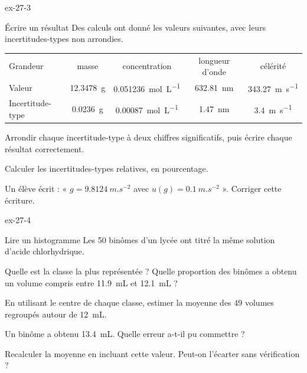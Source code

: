 \begin{blocLivre}{ex-27-3}
\begin{exercice}[1]{Écrire un résultat}
Des calculs ont donné les valeurs suivantes, avec leurs incertitudes-types non arrondies.
\begin{center}
\begin{tabular}{lcccc}
\toprule
Grandeur & masse & concentration & longueur d'onde & célérité \\
Valeur & \qty{12,3478}{g} & \qty{0,051236}{mol.L^{-1}} & \qty{632,81}{nm} & \qty{343,27}{m.s^{-1}} \\
Incertitude-type & \qty{0,0236}{g} & \qty{0,00087}{mol.L^{-1}} & \qty{1,47}{nm} & \qty{3,4}{m.s^{-1}} \\
\bottomrule
\end{tabular}
\end{center}
\begin{questions}
\item Arrondir chaque incertitude-type à deux chiffres significatifs, puis écrire chaque résultat correctement.
\item Calculer les incertitudes-types relatives, en pourcentage.
\item Un élève écrit : « $g=\qty{9,8124}{m.s^{-2}}$ avec $u(g)=\qty{0,1}{m.s^{-2}}$ ». Corriger cette écriture.
\end{questions}
\end{exercice}
\end{blocLivre}
\begin{blocLivre}{ex-27-4}
\begin{exercice}[1]{Lire un histogramme}
Les 50 binômes d'un lycée ont titré la même solution d'acide chlorhydrique.
\begin{questions}
\item Quelle est la classe la plus représentée ? Quelle proportion des binômes a obtenu un volume compris entre
\qty{11,9}{mL} et \qty{12,1}{mL} ?
\item En utilisant le centre de chaque classe, estimer la moyenne des 49 volumes regroupés autour de \qty{12}{mL}.
\item Un binôme a obtenu \qty{13,4}{mL}. Quelle erreur a-t-il pu commettre ?
\item Recalculer la moyenne en incluant cette valeur. Peut-on l'écarter sans vérification ?
\end{questions}
\end{exercice}
\end{blocLivre}
